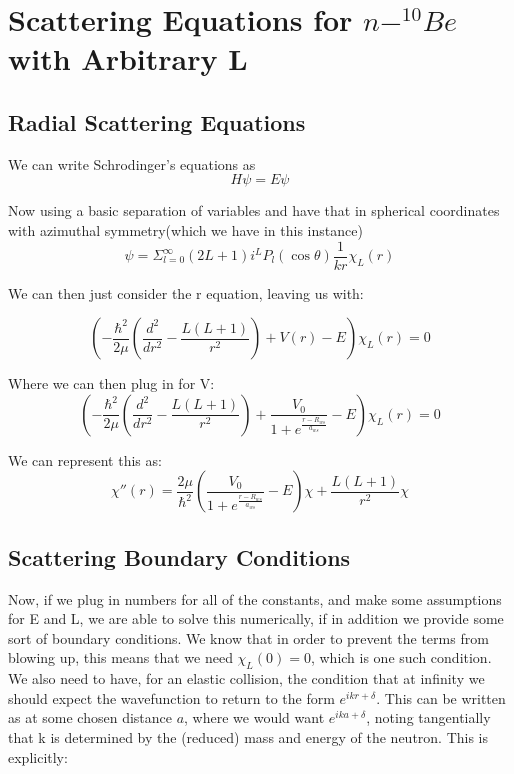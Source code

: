\documentclass[11pt]{article} %
\begin{document}
\section{Scattering Equations for  $n-^{10}Be $ with Arbitrary L}


\subsection{Radial Scattering Equations}
We can write Schrodinger's equations as 
\begin{equation}
H\psi=E\psi
\end{equation}

Now using a basic separation of variables and have that in spherical coordinates with azimuthal symmetry(which we have in this instance)\\

\begin{equation}
\psi=\Sigma_{l=0}^\infty (2L+1)i^LP_l(\cos\theta)\frac{1}{kr}\chi_L(r)
\end{equation}

We can then just consider the r equation, leaving us with:

\begin{equation}
(-\frac{\hbar^2}{2\mu}(\frac{d^2}{dr^2}-\frac{L(L+1)}{r^2})+V(r)-E)\chi_L(r)=0
\end{equation}

Where we can then plug in for V:\\
\begin{equation}
(-\frac{\hbar^2}{2\mu}(\frac{d^2}{dr^2}-\frac{L(L+1)}{r^2})+\frac{V_0}{1+e^{\frac{r-R_{ws}}{a_{ws}}}}-E)\chi_L(r)=0
\end{equation}

We can represent this as:\\

\begin{equation}
\boxed{\chi''(r)=\frac{2\mu}{\hbar^2}(\frac{V_0}{1+e^{\frac{r-R_{ws}}{a_{ws}}}}-E)\chi+\frac{L(L+1)}{r^2}\chi}
\end{equation}
\subsection{Scattering Boundary Conditions}
Now, if we plug in numbers for all of the constants, and make some assumptions for E and L, we are able to solve this numerically, if in addition we provide some sort of boundary conditions. We know that in order to prevent the terms from blowing up, this means that we need $\chi_L(0)=0$, which is one such condition. We also need to have, for an elastic collision, the condition that at infinity we should expect the wavefunction to return to the form $e^{ikr+\delta}$. This can be written as at some chosen distance $a$, where we would want $e^{ika+\delta}$, noting tangentially that k is determined by the (reduced) mass and energy of the neutron. This is explicitly:\\
\end{document}
